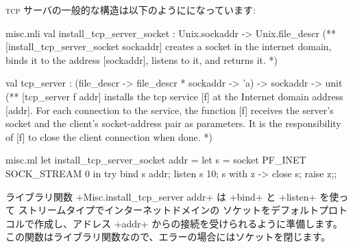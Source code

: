\textsc{tcp} サーバの一般的な構造は以下のようにになっています:
%
\begin{codefile}{misc.mli}
val install_tcp_server_socket : Unix.sockaddr -> Unix.file_descr
(** [install_tcp_server_socket sockaddr] creates a socket in the internet
 domain,  binds it to the address [sockaddr], listens to it, and returns
it. *)

val tcp_server :
 (file_descr -> file_descr * sockaddr -> 'a) -> sockaddr -> unit
(** [tcp_server f addr] installs the tcp service [f] at the Internet domain
   address  [addr]. For each connection to the service, the
   function [f] receives the server's socket and the client's
   socket-address pair as parameters. It is the responsibility of  [f] to
   close the client connection when done. *)
\end{codefile}
%
\begin{listingcodefile}{misc.ml}
let install_tcp_server_socket addr =
  let s = socket PF_INET SOCK_STREAM 0 in
  try
    bind s addr;
    listen s 10;
    s
  with z -> close s; raise z;;
\end{listingcodefile}
ライブラリ関数 \ml+Misc.install_tcp_server addr+ は \ml+bind+ と \ml+listen+ を使って
ストリームタイプでインターネットドメインの
ソケットをデフォルトプロトコルで作成し、アドレス \ml+addr+ からの接続を受けられるように準備します。
この関数はライブラリ関数なので、エラーの場合にはソケットを閉じます。

